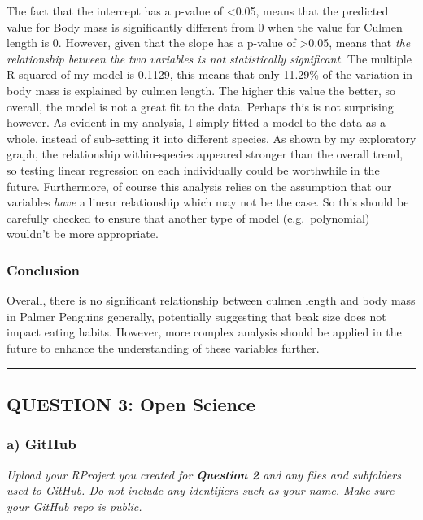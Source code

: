 \documentclass[
]{article}
\begin{document}
The fact that the intercept has a p-value of \textless0.05, means that
the predicted value for Body mass is significantly different from 0 when
the value for Culmen length is 0. However, given that the slope has a
p-value of \textgreater0.05, means that \emph{the relationship between
the two variables is not statistically significant.} The multiple
R-squared of my model is 0.1129, this means that only 11.29\% of the
variation in body mass is explained by culmen length. The higher this
value the better, so overall, the model is not a great fit to the data.
Perhaps this is not surprising however. As evident in my analysis, I
simply fitted a model to the data as a whole, instead of sub-setting it
into different species. As shown by my exploratory graph, the
relationship within-species appeared stronger than the overall trend, so
testing linear regression on each individually could be worthwhile in
the future. Furthermore, of course this analysis relies on the
assumption that our variables \emph{have} a linear relationship which
may not be the case. So this should be carefully checked to ensure that
another type of model (e.g.~polynomial) wouldn't be more appropriate.

\hypertarget{conclusion}{%
\subsubsection{Conclusion}\label{conclusion}}

Overall, there is no significant relationship between culmen length and
body mass in Palmer Penguins generally, potentially suggesting that beak
size does not impact eating habits. However, more complex analysis
should be applied in the future to enhance the understanding of these
variables further.

\begin{center}\rule{0.5\linewidth}{0.5pt}\end{center}

\hypertarget{question-3-open-science}{%
\subsection{QUESTION 3: Open Science}\label{question-3-open-science}}

\hypertarget{a-github}{%
\subsubsection{a) GitHub}\label{a-github}}

\emph{Upload your RProject you created for \textbf{Question 2} and any
files and subfolders used to GitHub. Do not include any identifiers such
as your name. Make sure your GitHub repo is public.}
\end{document}
